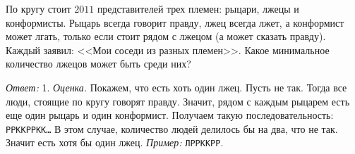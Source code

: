 \problem
По кругу стоит $2011$ представителей трех племен: рыцари, лжецы и конформисты.
Рыцарь всегда говорит правду, лжец всегда лжет, а конформист может лгать,
только если стоит рядом с лжецом (а может сказать правду).
Каждый заявил: <<Мои соседи из разных племен>>.
Какое минимальное количество лжецов может быть среди них?

\solution
\emph{Ответ:} 1.
\emph{Оценка.}
Покажем, что есть хоть один лжец.
Пусть не так.
Тогда все люди, стоящие по кругу говорят правду.
Значит, рядом с каждым рыцарем есть еще один рыцарь и один конформист.
Получаем такую последовательность: \texttt{РРККРРКК\ldots}
В этом случае, количество людей делилось бы на два, что не так.
Значит есть хотя бы один лжец.
\emph{Пример:} \texttt{ЛРРККРР}.

\endproblem
